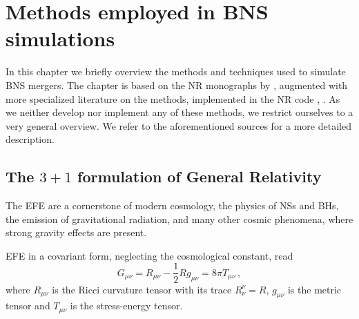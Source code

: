 \chapter{Methods employed in \ac{BNS} simulations}\label{ch:nr_methods}

In this chapter we briefly overview the methods and 
techniques used to simulate \ac{BNS} mergers. 
%
The chapter is based on the \ac{NR} monographs by 
\citet{Alcubierre:2008,Baumgarte:2010,Rezzolla:2013}, 
augmented with more specialized literature on the 
methods, implemented in the \ac{NR} code \wisky{}, 
\citep{Radice:2012cu,Radice:2016dwd,Radice:2017zta,Radice:2018pdn,Radice:2020ids}.
%
As we neither develop nor implement any of these methods, 
we restrict ourselves to a very general overview.
We refer to the aforementioned sources for a more detailed description.
%



\section{The $3+1$ formulation of General Relativity}\label{sec:nr_methods:nr}


The \ac{EFE} are a cornerstone of modern cosmology, the physics of 
\acp{NS} and \acp{BH}, the emission of gravitational radiation, 
and many other cosmic phenomena, where strong gravity effects are present. 

\ac{EFE} in a covariant form, neglecting the cosmological constant, read
%
\begin{equation}
G_{\mu\nu} = R_{\mu\nu} - \frac{1}{2} R g_{\mu\nu} = 8\pi T_{\mu\nu}\, ,
\label{eq:theory:EFE}
\end{equation}
%
%
where $R_{\mu\nu}$ is the Ricci curvature tensor with its trace 
$R^{\nu}_{\nu} = R$, $g_{\mu\nu}$ is the metric tensor and 
$T_{\mu\nu}$ is the stress-energy tensor.

